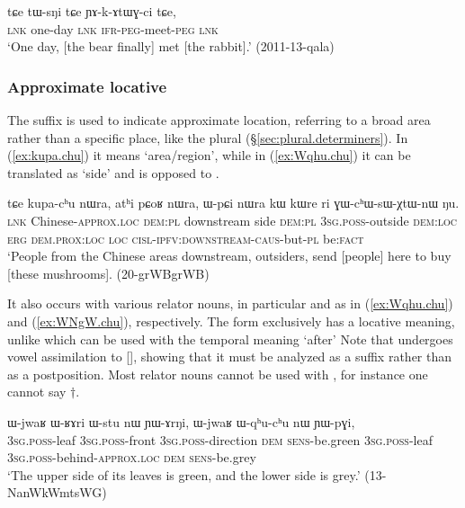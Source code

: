  \begin{exe}
\ex \label{ex:tWsNi.tCe}
\gll   tɕe tɯ-sŋi tɕe ɲɤ-k-ɤtɯɣ-ci tɕe, \\
\textsc{lnk} one-day \textsc{lnk} \textsc{ifr}-\textsc{peg}-meet-\textsc{peg} \textsc{lnk} \\
\glt  `One day, [the bear finally] met [the rabbit].' (2011-13-qala)
\end{exe}


\subsubsection{Approximate locative} \label{sec:approximate.locative}
The suffix  is used to indicate approximate location, referring to a broad area rather than a specific place, like the plural  (§\ref{sec:plural.determiners}). In (\ref{ex:kupa.chu}) it means `area/region', while in (\ref{ex:Wqhu.chu}) it can be translated as `side' and is opposed to .
 
 \begin{exe}
\ex \label{ex:kupa.chu}
 \gll  tɕe kupa-cʰu nɯra, atʰi pɕoʁ nɯra, ɯ-pɕi nɯra kɯ kɯre ri ɣɯ-cʰɯ-sɯ-χtɯ-nɯ ŋu.  \\
 \textsc{lnk} Chinese-\textsc{approx}.\textsc{loc} \textsc{dem}:\textsc{pl}  downstream side \textsc{dem}:\textsc{pl} \textsc{3sg}.\textsc{poss}-outside \textsc{dem}:\textsc{loc} \textsc{erg} \textsc{dem}.\textsc{prox}:\textsc{loc} \textsc{loc} \textsc{cisl}-\textsc{ipfv}:\textsc{downstream}-\textsc{caus}-but-\textsc{pl} be:\textsc{fact} \\
 \glt `People from the Chinese areas downstream, outsiders, send [people] here to buy [these mushrooms]. (20-grWBgrWB) 
 \end{exe} 
 
 It also occurs with various relator nouns, in particular  and  as in (\ref{ex:Wqhu.chu}) and (\ref{ex:WNgW.chu}), respectively. The form  exclusively has a locative meaning, unlike  which can be used with the temporal meaning `after' Note that  undergoes vowel assimilation to [], showing that it must be analyzed as a suffix rather than as a postposition. Most relator nouns cannot be used with , for instance one cannot say $\dagger$.

  \begin{exe}
\ex \label{ex:Wqhu.chu}
 \gll  ɯ-jwaʁ ɯ-ʁɤri ɯ-stu nɯ ɲɯ-ɤrŋi, ɯ-jwaʁ ɯ-qʰu-cʰu nɯ ɲɯ-pɣi, \\
 \textsc{3sg}.\textsc{poss}-leaf  \textsc{3sg}.\textsc{poss}-front \textsc{3sg}.\textsc{poss}-direction \textsc{dem} \textsc{sens}-be.green   \textsc{3sg}.\textsc{poss}-leaf  \textsc{3sg}.\textsc{poss}-behind-\textsc{approx}.\textsc{loc} \textsc{dem} \textsc{sens}-be.grey \\
 \glt  `The upper side of its leaves is green, and the lower side is grey.' (13-NanWkWmtsWG) 
  \end{exe}
  
